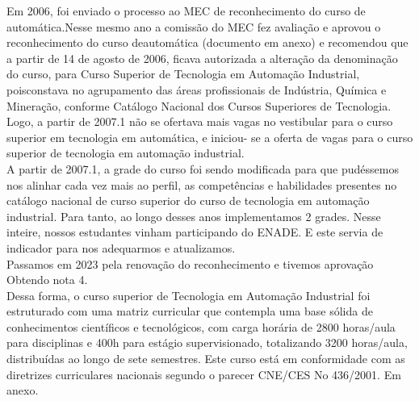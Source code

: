 
Em 2006, foi enviado o processo ao MEC de reconhecimento do curso de automática.Nesse mesmo ano a comissão do MEC fez avaliação e aprovou o reconhecimento do curso deautomática (documento em anexo) e recomendou que a partir de 14 de agosto de 2006, ficava autorizada a alteração da denominação do curso, para Curso Superior de Tecnologia em Automação Industrial, poisconstava no agrupamento das áreas profissionais de Indústria, Química e Mineração, conforme Catálogo Nacional dos Cursos Superiores de Tecnologia. Logo, a partir de 2007.1 não se ofertava mais vagas no vestibular para o curso superior em tecnologia em automática, e iniciou- se a oferta de vagas para o curso superior de tecnologia em automação industrial.\\

A partir de 2007.1, a grade do curso foi sendo modificada para que pudéssemos nos alinhar cada vez mais ao perfil, as competências e habilidades presentes no catálogo nacional de curso superior do curso de tecnologia em automação industrial.  Para tanto, ao longo desses anos implementamos 2 grades. Nesse inteire, nossos estudantes vinham participando do ENADE. E este servia de indicador para nos adequarmos e atualizamos.\\ 

Passamos em 2023 pela renovação do reconhecimento e tivemos aprovação Obtendo nota 4.\\

Dessa forma, o curso superior de Tecnologia em Automação Industrial foi estruturado com uma matriz curricular que contempla uma base sólida de conhecimentos científicos e tecnológicos, com carga horária de 2800 horas/aula para disciplinas e 400h para estágio supervisionado, totalizando 3200 horas/aula, distribuídas ao longo de sete semestres. Este curso está em conformidade com as diretrizes curriculares nacionais segundo o parecer CNE/CES No 436/2001. Em anexo.\\




